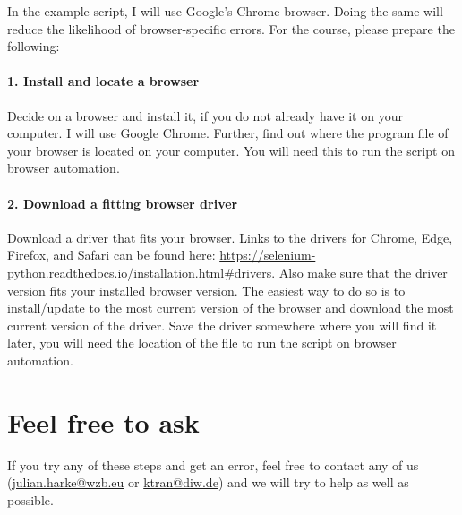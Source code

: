\documentclass[a4paper]{article}
\begin{document}
In the example script, I will use Google's Chrome browser. Doing the same will reduce the likelihood of browser-specific errors. For the course, please prepare the following:

\paragraph{1. Install and locate a browser} Decide on a browser and install it, if you do not already have it on your computer. I will use Google Chrome. Further, find out where the program file of your browser is located on your computer. You will need this to run the script on browser automation.

\paragraph{2. Download a fitting browser driver} Download a driver that fits your browser. Links to the drivers for Chrome, Edge, Firefox, and Safari can be found here: \url{https://selenium-python.readthedocs.io/installation.html#drivers}. Also make sure that the driver version fits your installed browser version. The easiest way to do so is to install/update to the most current version of the browser and download the most current version of the driver. Save the driver somewhere where you will find it later, you will need the location of the file to run the script on browser automation.

\section{Feel free to ask}

If you try any of these steps and get an error, feel free to contact any of us (\href{mailto:julian.harke@wzb.eu}{julian.harke@wzb.eu} or \href{mailto:ktran@diw.de}{ktran@diw.de}) and we will try to help as well as possible.
\end{document}
